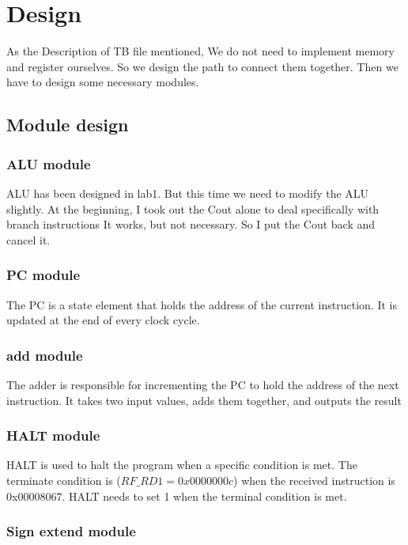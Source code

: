 \documentclass[12pt,a4paper]{article}
\begin{document}
\newpage

\section{Design}

As the Description of TB file mentioned, We do not need to implement memory and register ourselves.
So we design the path to connect them together.
Then we have to design some necessary modules.

\subsection{Module design}

\subsubsection{ALU module}

ALU has been designed in lab1.
But this time we need to modify the ALU slightly.
At the beginning, I took out the Cout alone to deal specifically with branch instructions
It works, but not necessary.
So I put the Cout back and cancel it.


\subsubsection{PC module}

The PC is a state element that holds the address of the current instruction. 
It is updated at the end of every clock cycle.

\subsubsection{add module}

The adder is responsible for incrementing the PC to hold the address of the next instruction.
It takes two input values, adds them together, and outputs the result

\subsubsection{HALT module}

HALT is used to halt the program when a specific condition is met.
The terminate condition is ($RF\_ RD1 = 0x0000000c$) when the received instruction is 0x00008067. 
HALT needs to set 1 when the terminal condition is met.

\subsubsection{Sign extend module}
\end{document}
